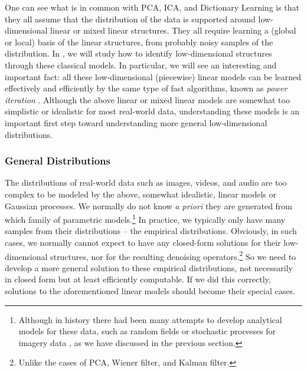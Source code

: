 \documentclass[../../book-main.tex]{subfiles}
\begin{document}
One can see what is in common with PCA, ICA, and Dictionary Learning is that they all assume that the distribution of the data is supported around low-dimensional linear or mixed linear structures. They all require learning a (global or local) basis of the linear structures, from probably noisy samples of the distribution. In , we will study how to identify low-dimensional structures through these classical models. In particular, we will see an interesting and important fact: all these low-dimensional (piecewise) linear models can be learned effectively and efficiently by the same type of fast algorithms, known as {\em power iteration} \cite{Zhai-2020}. Although the above linear or mixed linear models are somewhat too simplistic or idealistic for most real-world data, understanding these models is an important first step toward understanding more general low-dimensional distributions. 

\subsubsection{General Distributions}\label{sec:denoising-intro}

The distributions of real-world data such as images, videos, and audio are too complex to be modeled by the above, somewhat idealistic, linear models or Gaussian processes. We normally do not know {\em a priori} they are generated from which family of parametric models.\footnote{Although in history there had been many attempts to develop analytical models for these data, such as random fields or stochastic processes for imagery data \cite{Mumford-1999}, as we have discussed in the previous section.} In practice, we typically only have many samples from their distributions -- the empirical distributions. Obviously, in such cases, we normally cannot expect to have any closed-form solutions for their low-dimensional structures, nor for the resulting denoising operators.\footnote{Unlike the cases of PCA, Wiener filter, and Kalman filter.} So we need to develop a more general solution to these empirical distributions, not necessarily in closed form but at least efficiently computable. If we did this correctly, solutions to the aforementioned linear models should become their special cases. 
\end{document}
